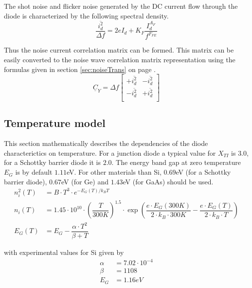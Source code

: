 The shot noise and flicker noise generated by the DC current flow
through the diode is characterized by the following spectral density.
\begin{equation}
\dfrac{\overline{i_{d}^2}}{\Delta f} = 2e I_d + K_F \dfrac{I_d^{A_F}}{f^{F_{FE}}}
\end{equation}

Thus the noise current correlation matrix can be formed.  This matrix
can be easily converted to the noise wave correlation matrix
representation using the formulas given in section
\ref{sec:noiseTrans} on page \pageref{sec:noiseTrans}.
\begin{equation}
\underline{C}_Y = \Delta f
\begin{bmatrix}
+\overline{i_{d}^2} & -\overline{i_{d}^2}\\
-\overline{i_{d}^2} & +\overline{i_{d}^2}\\
\end{bmatrix}
\end{equation}

\subsection{Temperature model}
\label{sec:DiodeTemp}

This section mathematically describes the dependencies of the diode
characterictics on temperature.  For a junction diode a typical value
for $X_{TI}$ is $3.0$, for a Schottky barrier diode it is $2.0$.  The
energy band gap at zero temperature $E_G$ is by default $1.11$eV.  For
other materials than Si, $0.69$eV (for a Schottky barrier diode),
$0.67$eV (for Ge) and $1.43$eV (for GaAs) should be used.
\begin{align}
n_i^2\left(T\right) &= B\cdot T^3 \cdot e^{-E_G\left(T\right)/k_B T}\\
n_i\left(T\right) &= 1.45\cdot 10^{10}\cdot \left(\dfrac{T}{300K}\right)^{1.5}\cdot\exp{\left(\dfrac{e\cdot E_G\left(300K\right)}{2\cdot k_B\cdot 300K} - \dfrac{e\cdot E_G\left(T\right)}{2\cdot k_B\cdot T}\right)}\\
E_G\left(T\right) &= E_G - \dfrac{\alpha\cdot T^2}{\beta + T}
\end{align}

with experimental values for Si given by
\begin{align*}
\alpha &= 7.02\cdot 10^{-4}\\
\beta &= 1108\\
E_G &= 1.16eV
\end{align*}

